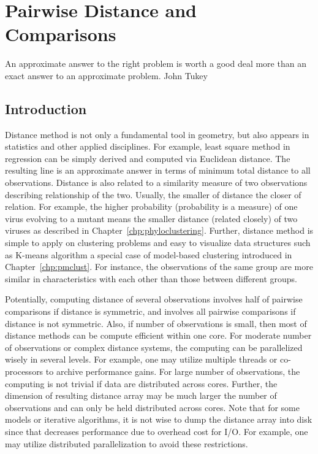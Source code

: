 \chapter{Pairwise Distance and Comparisons}
\label{chp:pairwise}

\inspire%
{An approximate answer to the right problem is worth a good deal more than
an exact answer to an approximate problem.}%
{John Tukey}


\section{Introduction}

Distance method is not only a fundamental tool in geometry, but also appears
in statistics and other applied disciplines. For
example, least square method in regression can be simply derived and computed
via Euclidean distance. The resulting line is an approximate answer
in terms of minimum total distance to all observations. Distance is also
related to a similarity measure of two observations describing
relationship of the two.
Usually, the smaller of distance the closer of relation. For example, the
higher probability (probability is a measure) of
one virus evolving to a mutant means the smaller distance (related closely)
of two viruses as described in Chapter~\ref{chp:phyloclustering}.
Further, distance method is simple to apply on clustering problems
and easy to visualize data structures such as K-means algorithm
a special case of model-based clustering
introduced in Chapter~\ref{chp:pmclust}. For instance,
the observations of the same group are more similar in characteristics with
each other than those between different groups.

Potentially, computing distance of several observations involves half of
pairwise comparisons if distance is symmetric, and involves all pairwise
comparisons if distance is not symmetric. Also, if number of observations
is small, then most of distance methods can be compute efficient within
one core. For moderate number of observations or complex distance systems,
the computing can be parallelized wisely in several levels. For example,
one may utilize multiple threads or co-processors
to archive performance gains.
For large number of observations, the computing is not trivial if
data are distributed across cores. Further, the dimension of resulting
distance array may be much larger the number of observations and
can only be held distributed across cores.
Note that for some models or iterative algorithms, it is not wise to dump the
distance array into disk since that decreases performance due to overhead
cost for I/O. For example, one may utilize
distributed parallelization to avoid these restrictions.

